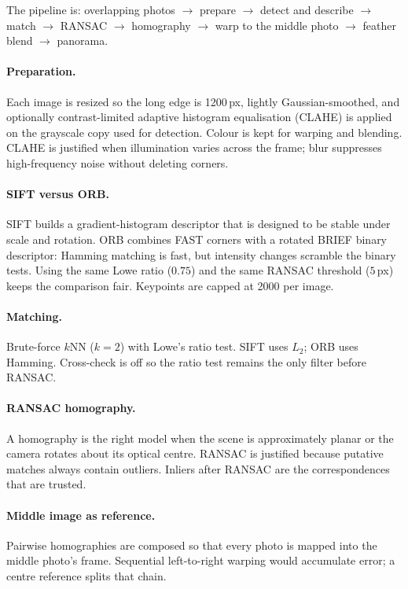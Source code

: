 \documentclass[10pt,twocolumn,letterpaper]{article}
\begin{document}
The pipeline is: overlapping photos $\rightarrow$ prepare $\rightarrow$ detect and describe $\rightarrow$ match $\rightarrow$ RANSAC $\rightarrow$ homography $\rightarrow$ warp to the middle photo $\rightarrow$ feather blend $\rightarrow$ panorama.

\paragraph{Preparation.}
Each image is resized so the long edge is 1200\,px, lightly Gaussian-smoothed, and optionally contrast-limited adaptive histogram equalisation (CLAHE) is applied on the grayscale copy used for detection. Colour is kept for warping and blending. CLAHE is justified when illumination varies across the frame; blur suppresses high-frequency noise without deleting corners.

\paragraph{SIFT versus ORB.}
SIFT builds a gradient-histogram descriptor that is designed to be stable under scale and rotation. ORB combines FAST corners with a rotated BRIEF binary descriptor: Hamming matching is fast, but intensity changes scramble the binary tests. Using the same Lowe ratio ($0.75$) and the same RANSAC threshold ($5$\,px) keeps the comparison fair. Keypoints are capped at 2000 per image.

\paragraph{Matching.}
Brute-force $k$NN ($k{=}2$) with Lowe's ratio test. SIFT uses $L_2$; ORB uses Hamming. Cross-check is off so the ratio test remains the only filter before RANSAC.

\paragraph{RANSAC homography.}
A homography is the right model when the scene is approximately planar or the camera rotates about its optical centre. RANSAC is justified because putative matches always contain outliers. Inliers after RANSAC are the correspondences that are trusted.

\paragraph{Middle image as reference.}
Pairwise homographies are composed so that every photo is mapped into the middle photo's frame. Sequential left-to-right warping would accumulate error; a centre reference splits that chain.
\end{document}
